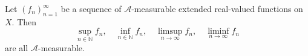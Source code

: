 Let $(f_n)_{n=1}^{\infty}$ be a sequence of $\mathcal{A}$-measurable extended real-valued functions on $X$. Then
$$\sup_{n \in \mathbb{N}} f_n,\quad \inf_{n \in \mathbb{N}} f_n,\quad \limsup_{n \to \infty} f_n,\quad \liminf_{n \to \infty} f_n$$
are all $\mathcal{A}$-measurable.